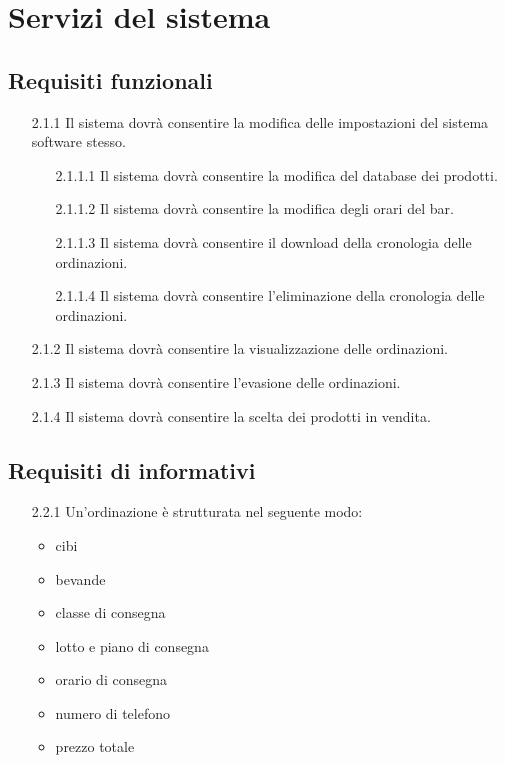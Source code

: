 \documentclass[a4paper,11pt]{article}       %
\begin{document}
\section{Servizi del sistema}
    \subsection{Requisiti funzionali}
        
        \begin{itemize}
            \item[2.1.1] Il sistema dovrà consentire la modifica delle impostazioni del sistema software stesso.
                \begin{itemize}
                    \item[2.1.1.1] Il sistema dovrà consentire la modifica del \gls{database} dei prodotti.
                    \item[2.1.1.2] Il sistema dovrà consentire la modifica degli orari del bar.
                    \item[2.1.1.3] Il sistema dovrà consentire il download della cronologia delle ordinazioni.
                    \item[2.1.1.4] Il sistema dovrà consentire l'eliminazione della cronologia delle ordinazioni.
                \end{itemize}
            \item[2.1.2] Il sistema dovrà consentire la visualizzazione delle ordinazioni.
            \item[2.1.3] Il sistema dovrà consentire l'evasione delle ordinazioni.
            \item[2.1.4] Il sistema dovrà consentire la scelta dei prodotti in vendita.
        \end{itemize}
        
    \subsection{Requisiti di informativi}
        \begin{itemize}
            \item[2.2.1] Un'ordinazione è strutturata nel seguente modo:
                \begin{itemize}
                    \item cibi
                    \item bevande
                    \item classe di consegna
                    \item lotto e piano di consegna
                    \item orario di consegna
                    \item numero di telefono
                    \item prezzo totale
                \end{itemize}
        \end{itemize}
\end{document}
